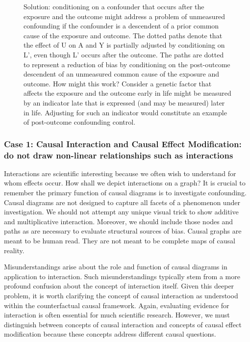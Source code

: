 \documentclass[
  singlecolumn]{article}
\begin{document}
\begin{figure}


\caption{\label{fig-dag-descendent-solution-2}Solution: conditioning on
a confounder that occurs after the exposure and the outcome might
address a problem of unmeasured confounding if the confounder is a
descendent of a prior common cause of the exposure and outcome. The
dotted paths denote that the effect of U on A and Y is partially
adjusted by conditioning on L', even though L' occurs after the outcome.
The paths are dotted to represent a reduction of bias by conditioning on
the post-outcome descendent of an unmeasured common cause of the
exposure and outcome. How might this work? Consider a genetic factor
that affects the exposure and the outcome early in life might be
measured by an indicator late that is expressed (and may be measured)
later in life. Adjusting for such an indicator would constitute an
example of post-outcome confounding control.}

\end{figure}%

\subsubsection{Case 1: Causal Interaction and Causal Effect
Modification: do not draw non-linear relationships such as
interactions}\label{case-1-causal-interaction-and-causal-effect-modification-do-not-draw-non-linear-relationships-such-as-interactions}

Interactions are scientific interesting because we often wish to
understand for whom effects occur. How shall we depict interactions on a
graph? It is crucial to remember the primary function of causal diagrams
is to investigate confounding. Causal diagrams are not designed to
capture all facets of a phenomenon under investigation. We should not
attempt any unique visual trick to show additive and multiplicative
interaction. Moreover, we should include those nodes and paths as are
necessary to evaluate structural sources of bias. Causal graphs are
meant to be human read. They are not meant to be complete maps of causal
reality.

Misunderstandings arise about the role and function of causal diagrams
in application to interaction. Such misunderstandings typically stem
from a more profound confusion about the concept of interaction itself.
Given this deeper problem, it is worth clarifying the concept of causal
interaction as understood within the counterfactual causal framework.
Again, evaluating evidence for interaction is often essential for much
scientific research. However, we must distinguish between concepts of
causal interaction and concepts of causal effect modification because
these concepts address different causal questions.
\end{document}
